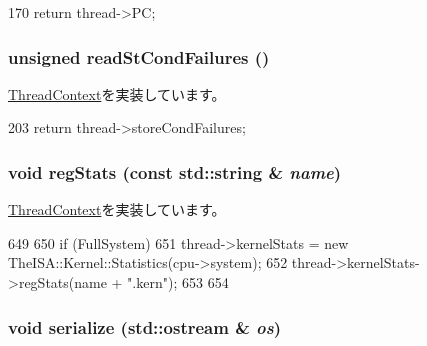 \begin{DoxyCode}
170 { return thread->PC; }
\end{DoxyCode}
\hypertarget{classOzoneCPU_1_1OzoneTC_a25b995a791e41965e088d8bf3f2bf859}{
\subsubsection[{readStCondFailures}]{\setlength{\rightskip}{0pt plus 5cm}unsigned readStCondFailures ()}}
\label{classOzoneCPU_1_1OzoneTC_a25b995a791e41965e088d8bf3f2bf859}


\hyperlink{classThreadContext_ab1bc64ec54c1cc47c9945fe68fa9e91c}{ThreadContext}を実装しています。


\begin{DoxyCode}
203         { return thread->storeCondFailures; }
\end{DoxyCode}
\hypertarget{classOzoneCPU_1_1OzoneTC_a3dd3443357312bcb75580eaa508c48a4}{
\subsubsection[{regStats}]{\setlength{\rightskip}{0pt plus 5cm}void regStats (const std::string \& {\em name})}}
\label{classOzoneCPU_1_1OzoneTC_a3dd3443357312bcb75580eaa508c48a4}


\hyperlink{classThreadContext_a6450b5fad5603ec545c4bf5ff01e0646}{ThreadContext}を実装しています。


\begin{DoxyCode}
649 {
650     if (FullSystem) {
651         thread->kernelStats = new TheISA::Kernel::Statistics(cpu->system);
652         thread->kernelStats->regStats(name + ".kern");
653     }
654 }
\end{DoxyCode}
\hypertarget{classOzoneCPU_1_1OzoneTC_a53e036786d17361be4c7320d39c99b84}{
\subsubsection[{serialize}]{\setlength{\rightskip}{0pt plus 5cm}void serialize (std::ostream \& {\em os})}}
\label{classOzoneCPU_1_1OzoneTC_a53e036786d17361be4c7320d39c99b84}



